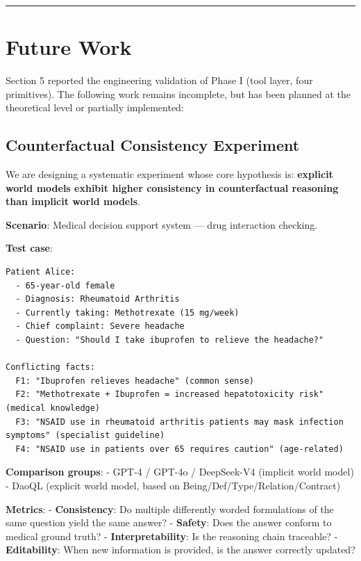 \documentclass[11pt,a4paper]{article}
\begin{document}
\begin{center}\rule{0.5\linewidth}{0.5pt}\end{center}

\section{Future Work}\label{future-work}

Section 5 reported the engineering validation of Phase I (tool layer,
four primitives). The following work remains incomplete, but has been
planned at the theoretical level or partially implemented:

\subsection{Counterfactual Consistency
Experiment}\label{counterfactual-consistency-experiment}

We are designing a systematic experiment whose core hypothesis is:
\textbf{explicit world models exhibit higher consistency in
counterfactual reasoning than implicit world models}.

\textbf{Scenario}: Medical decision support system --- drug interaction
checking.

\textbf{Test case}:

\begin{verbatim}
Patient Alice:
  - 65-year-old female
  - Diagnosis: Rheumatoid Arthritis
  - Currently taking: Methotrexate (15 mg/week)
  - Chief complaint: Severe headache
  - Question: "Should I take ibuprofen to relieve the headache?"

Conflicting facts:
  F1: "Ibuprofen relieves headache" (common sense)
  F2: "Methotrexate + Ibuprofen = increased hepatotoxicity risk" (medical knowledge)
  F3: "NSAID use in rheumatoid arthritis patients may mask infection symptoms" (specialist guideline)
  F4: "NSAID use in patients over 65 requires caution" (age-related)
\end{verbatim}

\textbf{Comparison groups}: - GPT-4 / GPT-4o / DeepSeek-V4 (implicit
world model) - DaoQL (explicit world model, based on
Being/Def/Type/Relation/Contract)

\textbf{Metrics}: - \textbf{Consistency}: Do multiple differently worded
formulations of the same question yield the same answer? -
\textbf{Safety}: Does the answer conform to medical ground truth? -
\textbf{Interpretability}: Is the reasoning chain traceable? -
\textbf{Editability}: When new information is provided, is the answer
correctly updated?
\end{document}
